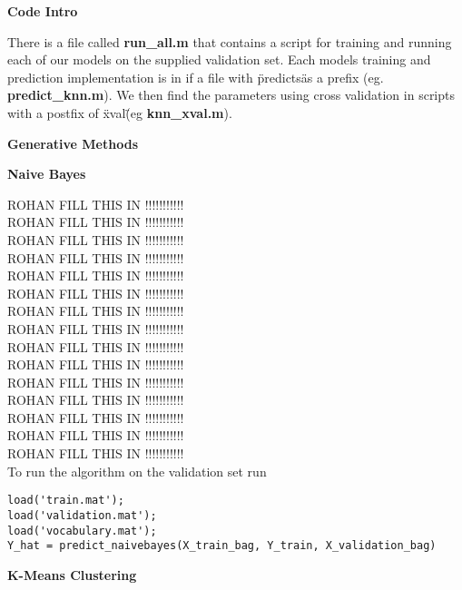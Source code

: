 \documentclass[12pt, a4paper]{article}
\title{}
\author{Tyler Altenhofen, Rohan Alur}
\date{}
\begin{document}
\maketitle

{\Large\textbf{Code Intro}}

There is a file called \textbf{run\_all.m} that contains a script for training and running each of our models on the supplied validation set. Each models training and prediction implementation is in if a file with \"predicts\" as a prefix (eg. \textbf{predict\_knn.m}). We then find the parameters using cross validation in scripts with a postfix of \"xval\" (eg \textbf{knn\_xval.m}).

\vspace{5mm}

{\Large\textbf{Generative Methods}}

\vspace{3mm}

{\large\textbf{Naive Bayes}}

\vspace{3mm}
ROHAN FILL THIS IN !!!!!!!!!!!\\
ROHAN FILL THIS IN !!!!!!!!!!!\\
ROHAN FILL THIS IN !!!!!!!!!!!\\
ROHAN FILL THIS IN !!!!!!!!!!!\\
ROHAN FILL THIS IN !!!!!!!!!!!\\
ROHAN FILL THIS IN !!!!!!!!!!!\\
ROHAN FILL THIS IN !!!!!!!!!!!\\
ROHAN FILL THIS IN !!!!!!!!!!!\\
ROHAN FILL THIS IN !!!!!!!!!!!\\
ROHAN FILL THIS IN !!!!!!!!!!!\\
ROHAN FILL THIS IN !!!!!!!!!!!\\
ROHAN FILL THIS IN !!!!!!!!!!!\\
ROHAN FILL THIS IN !!!!!!!!!!!\\
ROHAN FILL THIS IN !!!!!!!!!!!\\
ROHAN FILL THIS IN !!!!!!!!!!!\\

To run the algorithm on the validation set run
\begin{verbatim}
load('train.mat');
load('validation.mat');
load('vocabulary.mat');
Y_hat = predict_naivebayes(X_train_bag, Y_train, X_validation_bag)
\end{verbatim}

\vspace{3mm}
{\large\textbf{K-Means Clustering}}
\end{document}
